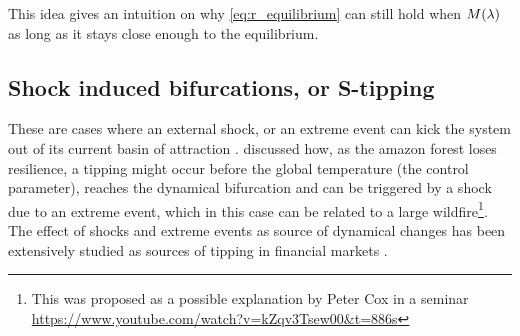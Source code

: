 This idea gives an intuition on why \cref{eq:r_equilibrium} can still hold when $M(\lambda)$ as long as it stays close enough to the equilibrium.%


\subsection{Shock induced bifurcations, or S-tipping}

These are cases where an external shock, or an extreme event can kick the system out of its current basin of attraction \citep{Halekotte2020}.
\cite{Parry2022} discussed how, as the amazon forest loses resilience, a tipping might occur before   the global temperature (the control parameter), reaches the dynamical bifurcation and can be triggered by a  shock due to an extreme event, which in this case can be related to a large wildfire\footnote{This was proposed as a possible explanation by Peter Cox in a seminar \url{https://www.youtube.com/watch?v=kZqv3Tsew00&t=886s}}.  
The effect of shocks and extreme events as source of dynamical changes has been extensively studied as sources of tipping in financial markets   \citep{Sornette2009a}.

